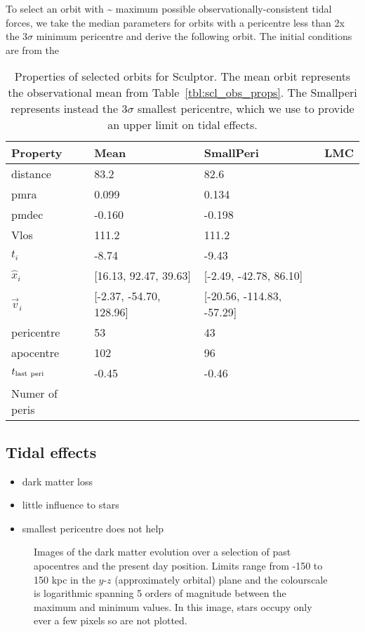 To select an orbit with \textasciitilde{} maximum possible
observationally-consistent tidal forces, we take the median parameters
for orbits with a pericentre less than 2x the 3\(\sigma\) minimum
pericentre and derive the following orbit. The initial conditions are
from the

\begin{table*}[t]
\centering
\caption[Sculptor Selected Orbits]{Properties of selected orbits for Sculptor. The mean orbit represents the observational mean from Table \ref{tbl:scl_obs_props}. The Smallperi represents instead the $3\sigma$ smallest pericentre, which we use to provide an upper limit on tidal effects. }
\label{tbl:scl_obrits}
\begin{tabular}{llll}
\toprule
Property & Mean & SmallPeri & LMC\\
\midrule
distance & 83.2 & 82.6 & \\
pmra & 0.099 & 0.134 & \\
pmdec & -0.160 & -0.198 & \\
Vlos & 111.2 & 111.2 & \\
$t_i$ & -8.74 & -9.43 & \\
$\hat{x}_{i}$ & [16.13, 92.47, 39.63] & [-2.49, -42.78, 86.10] & \\
$\vec{v}_i$ & [-2.37, -54.70, 128.96] & [-20.56, -114.83, -57.29] & \\
pericentre & 53 & 43 & \\
apocentre & 102 & 96 & \\
$t_{\rm last\ peri}$ & -0.45 & -0.46 & \\
Numer of peris &  &  & \\
\bottomrule
\end{tabular}
\end{table*}

\subsection{Tidal effects}\label{tidal-effects}

\begin{itemize}
\tightlist
\item
  dark matter loss
\item
  little influence to stars
\item
  smallest pericentre does not help
\end{itemize}

\begin{figure}
\centering
{}
\caption[Sculptor simulation snapshots]{Images of the dark matter
evolution over a selection of past apocentres and the present day
position. Limits range from -150 to 150 kpc in the \(y\)-\(z\)
(approximately orbital) plane and the colourscale is logarithmic
spanning 5 orders of magnitude between the maximum and minimum values.
In this image, stars occupy only ever a few pixels so are not plotted.}
\end{figure}


